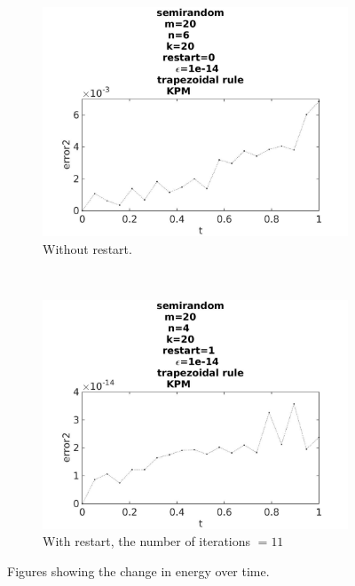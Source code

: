 \begin{figure}[H]
        \begin{subfigure}[b]{0.45\textwidth}
                \includegraphics[width=\textwidth]{../MATLAB/fig/errorarnrestart0.jpg}
                \caption{  Without restart. }
                \label{fig:energyarnrestart0}
        \end{subfigure}%
        ~
        \begin{subfigure}[b]{0.45\textwidth}
                \includegraphics[width=\textwidth]{../MATLAB/fig/errorarnrestart1.jpg}
                \caption{ With restart, the number of iterations $ = 11$ }
                \label{fig:energyarnrestart1}
        \end{subfigure}
        \caption{ Figures showing the change in energy over time. }
        \label{fig:energyarnrestart}
\end{figure}

